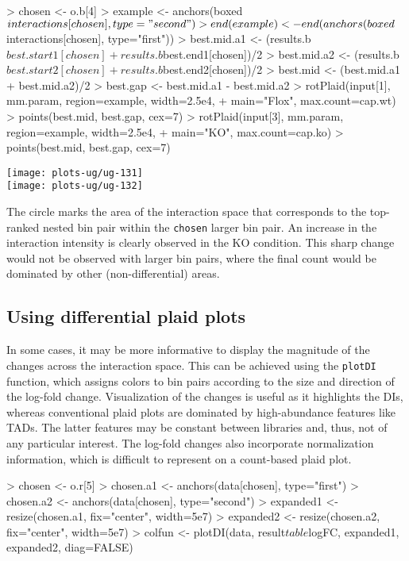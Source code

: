 \documentclass[12pt]{report}
\renewenvironment{Schunk}{\vspace{0pt}}{\vspace{0pt}}
\newcommand{\code}[1]{{\small\texttt{#1}}}
\begin{document}
\begin{Schunk}
\begin{Sinput}
> chosen <- o.b[4]
> example <- anchors(boxed$interactions[chosen], type="second")
> end(example) <- end(anchors(boxed$interactions[chosen], type="first"))
> best.mid.a1 <- (results.b$best.start1[chosen]+results.b$best.end1[chosen])/2
> best.mid.a2 <- (results.b$best.start2[chosen]+results.b$best.end2[chosen])/2
> best.mid <- (best.mid.a1 + best.mid.a2)/2
> best.gap <- best.mid.a1 - best.mid.a2
> rotPlaid(input[1], mm.param, region=example, width=2.5e4, 
+     main="Flox", max.count=cap.wt)
> points(best.mid, best.gap, cex=7) 
> rotPlaid(input[3], mm.param, region=example, width=2.5e4,
+     main="KO", max.count=cap.ko)
> points(best.mid, best.gap, cex=7) 
\end{Sinput}
\end{Schunk}

\begin{center}
\texttt{[image: plots-ug/ug-131]}
\\
\texttt{[image: plots-ug/ug-132]}
\end{center}

The circle marks the area of the interaction space that corresponds to the top-ranked nested bin pair within the \code{chosen} larger bin pair.
An increase in the interaction intensity is clearly observed in the KO condition.
This sharp change would not be observed with larger bin pairs, where the final count would be dominated by other (non-differential) areas.

\subsection{Using differential plaid plots}
In some cases, it may be more informative to display the magnitude of the changes across the interaction space.
This can be achieved using the \code{plotDI} function, which assigns colors to bin pairs according to the size and direction of the log-fold change.
Visualization of the changes is useful as it highlights the DIs, whereas conventional plaid plots are dominated by high-abundance features like TADs.
The latter features may be constant between libraries and, thus, not of any particular interest.
The log-fold changes also incorporate normalization information, which is difficult to represent on a count-based plaid plot.

\begin{Schunk}
\begin{Sinput}
> chosen <- o.r[5]
> chosen.a1 <- anchors(data[chosen], type="first")
> chosen.a2 <- anchors(data[chosen], type="second")
> expanded1 <- resize(chosen.a1, fix="center", width=5e7)
> expanded2 <- resize(chosen.a2, fix="center", width=5e7)
> colfun <- plotDI(data, result$table$logFC, expanded1, expanded2, diag=FALSE)
\end{Sinput}
\end{Schunk}
\end{document}
